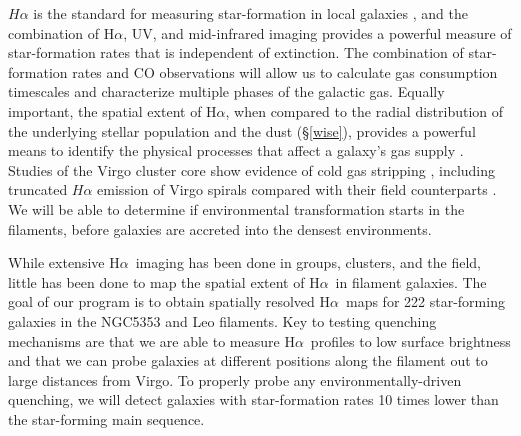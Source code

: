 \documentclass[11pt, preprint]{aastex}
\newcommand{\ha}{H$\alpha$}
\begin{document}
$H\alpha$ is the standard for measuring star-formation in local galaxies
\citep[e.g.][]{kennicutt98}, and the combination of \ha, UV, 
and mid-infrared imaging provides a powerful measure of star-formation
rates that is independent of extinction.  The
combination of star-formation rates and CO observations will allow us to calculate
gas consumption timescales and characterize multiple phases of the
galactic gas. 
Equally important, the spatial extent of \ha, when compared to the
radial distribution of the underlying stellar population and the dust (\S\ref{wise}), provides a powerful
means to identify the physical processes that affect a galaxy's gas
supply \citep[e.g.][]{hodge83, dale01, gavazzi12,boselli15}.
Studies of the Virgo cluster core show evidence of cold gas stripping
\citep[e.g.][]{crowl05, chung07, corbelli12, gavazzi12, boselli15}, including truncated $H\alpha$ emission of Virgo spirals
compared with their field counterparts \citep{koopmann04}.
We will be able to determine if environmental transformation starts in
the filaments, before galaxies are accreted into the densest environments.

While extensive \ha \ imaging has been done in groups, clusters, and the field,
little has been done to map the spatial extent of \ha \ in filament
galaxies.  
The goal of our program is to obtain spatially resolved \ha \ maps for 222 star-forming galaxies in
the NGC5353 and Leo filaments. Key to testing quenching mechanisms are that we are able to measure \ha \ profiles to low surface brightness and that we can
probe galaxies at different positions along the filament out to large
distances from Virgo.
To properly probe any environmentally-driven quenching, we will detect galaxies
with star-formation rates 10 times lower than the star-forming main sequence. 
\end{document}
